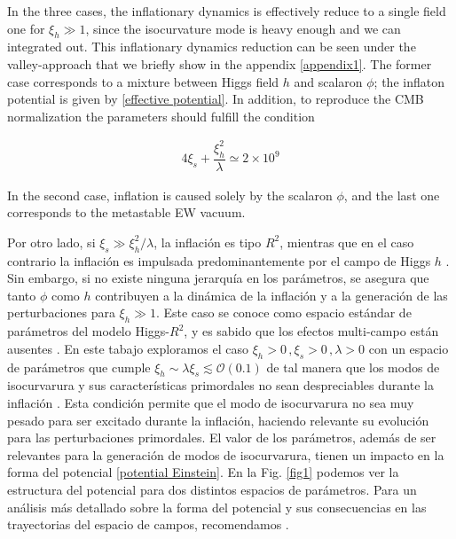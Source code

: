 \documentclass[12pt,a4paper,english,nofootinbib]{revtex4}
\newcommand{\beq}{\begin{eqnarray}}
\newcommand{\enq}{\end{eqnarray}}
\begin{document}
In the three cases, the inflationary dynamics is effectively reduce to a single field one for $\xi_h \gg 1$, since the isocurvature mode is heavy enough and we can integrated out. This inflationary dynamics reduction can be seen under the valley-approach that we briefly show in the appendix \ref{appendix1}.
The former case corresponds to a mixture between Higgs field $h$ and scalaron $\phi$; the inflaton potential is given by \eqref{effective potential}.  In addition, to reproduce the CMB normalization the parameters should fulfill the condition

\beq 
    4\xi_s + \dfrac{\xi_h^2}{\lambda} \simeq 2\times 10^{9}
    \label{CMB constraint}
\enq 


In the second case, inflation is caused solely by the scalaron $\phi$, and the last one corresponds to the metastable EW vacuum. 

Por otro lado, si $\xi_s \gg \xi_h^2/\lambda$, la inflación es tipo $R^2$, mientras que en el caso contrario la inflación es impulsada predominantemente por el campo de Higgs $h$ \cite{EMA2017}. Sin embargo, si no existe ninguna jerarquía en los parámetros, se asegura que tanto $\phi$ como $h$ contribuyen a la dinámica de la inflación y a la generación de las perturbaciones para $\xi_h \gg 1$. Este caso se conoce como espacio estándar de parámetros del modelo Higgs-$R^2$, y es sabido que los efectos multi-campo están ausentes \cite{ Wang2017, GUNDHI2020}.
En este tabajo exploramos el caso $\xi_h >0\,,\xi_s >0\,, \lambda >0$ con un espacio de parámetros que cumple $\xi_h \sim \lambda \xi_s \lesssim \mathcal{O}(0.1)$ de tal manera que los modos de isocurvarura y sus características primordales no sean despreciables durante la inflación \cite{Ema_2024}. Esta condición  permite que el modo de isocurvarura no sea muy pesado para ser excitado durante la inflación, haciendo relevante su evolución para las perturbaciones primordales. El valor de los parámetros, además de ser relevantes para la generación de modos de isocurvarura, tienen un impacto en la forma del potencial \eqref{potential Einstein}. En la Fig. \ref{fig1} podemos ver la estructura del potencial para dos distintos espacios de parámetros. Para un análisis más detallado sobre la forma del potencial y sus consecuencias en las trayectorias del espacio de campos, recomendamos \cite{GUNDHI2020}.
\end{document}

